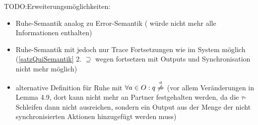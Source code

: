 \scriptsize\textcolor{lgray}{TODO:\@ Erweiterungsmöglichkeiten:
\begin{itemize}
  \item Ruhe-Semantik analog zu Error-Semantik (\EL{} würde nicht mehr alle
    Informationen enthalten)
  \item Ruhe-Semantik mit \prune{} jedoch nur Trace Fortsetzungen wie im System
    möglich (\ref{satzQuiSemantik} 2. $\supseteq$ wegen fortsetzen mit Outputs
    und Synchronisation nicht mehr möglich)
  \item alternative Definition für Ruhe mit $\forall a\in O: q
    \overset{a}{\not{\hspace{-0.1cm}\Rightarrow}}$ (vor allem Veränderungen in
    Lemma 4.9, dort kann nicht mehr an Partner festgehalten werden, da die
    $\tau$-Schleifen dann nicht ausreichen, sondern ein Output aus der Menge
    der nicht synchronisierten Aktionen hinzugefügt werden muss)
\end{itemize}}

\normalsize
